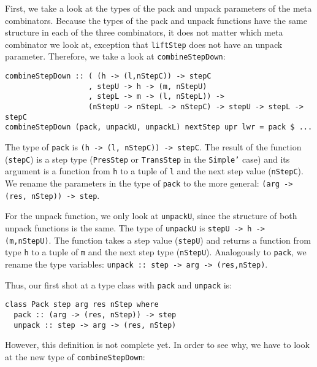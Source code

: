 First, we take a look at the types of the pack and unpack parameters of the meta combinators. Because the types of the pack and unpack functions have the same structure in each of the three combinators, it does not matter which meta combinator we look at, exception that \texttt{liftStep} does not have an unpack parameter. Therefore, we take a look at \texttt{combineStepDown}:

\begin{small}
\begin{verbatim}
combineStepDown :: ( (h -> (l,nStepC)) -> stepC 
                   , stepU -> h -> (m, nStepU)
                   , stepL -> m -> (l, nStepL)) -> 
                   (nStepU -> nStepL -> nStepC) -> stepU -> stepL -> stepC
combineStepDown (pack, unpackU, unpackL) nextStep upr lwr = pack $ ...

\end{verbatim}
\end{small}

The type of \texttt{pack} is \texttt{(h -> (l, nStepC)) -> stepC}. The result of the function (\texttt{stepC}) is a step type (\texttt{PresStep} or \texttt{TransStep} in the \texttt{Simple'} case) and its argument is a function from \texttt{h} to a tuple of \texttt{l} and the next step value (\texttt{nStepC}). We rename the parameters in the type of \texttt{pack} to the more general: \texttt{(arg -> (res, nStep)) -> step}.

For the unpack function, we only look at \texttt{unpackU}, since the structure of both unpack functions is the same. The type of \texttt{unpackU} is \texttt{stepU -> h -> (m,nStepU)}. The function takes a step value (\texttt{stepU}) and returns a function from type \texttt{h} to a tuple of \texttt{m} and the next step type (\texttt{nStepU}). Analogously to \texttt{pack}, we rename the type variables: \texttt{unpack :: step -> arg -> (res,nStep)}. 

Thus, our first shot at a type class with \texttt{pack} and \texttt{unpack} is:

\begin{small}
\begin{verbatim}
class Pack step arg res nStep where
  pack :: (arg -> (res, nStep)) -> step
  unpack :: step -> arg -> (res, nStep)
\end{verbatim}
\end{small}

However, this definition is not complete yet. In order to see why, we have to look at the new type of \texttt{combineStepDown}:

